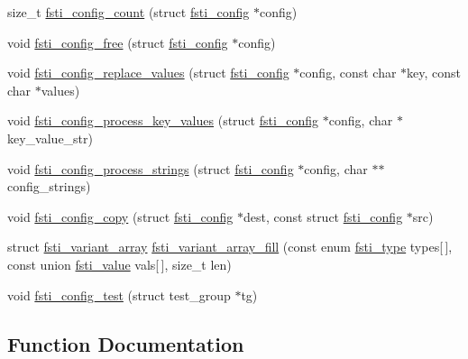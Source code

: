 \begin{DoxyCompactItemize}
size\+\_\+t \mbox{\hyperlink{fsti-config_8c_a508022bb109124636ed4c7e0002c2c08}{fsti\+\_\+config\+\_\+count}} (struct \mbox{\hyperlink{structfsti__config}{fsti\+\_\+config}} $\ast$config)
\item 
void \mbox{\hyperlink{fsti-config_8c_a89af0836846de6cf965e78643823705c}{fsti\+\_\+config\+\_\+free}} (struct \mbox{\hyperlink{structfsti__config}{fsti\+\_\+config}} $\ast$config)
\item 
void \mbox{\hyperlink{fsti-config_8c_ad11a9e59945cf4619a85164441ea5fd8}{fsti\+\_\+config\+\_\+replace\+\_\+values}} (struct \mbox{\hyperlink{structfsti__config}{fsti\+\_\+config}} $\ast$config, const char $\ast$key, const char $\ast$values)
\item 
void \mbox{\hyperlink{fsti-config_8c_a966baf752f37fcb8177ec0d42d9f103f}{fsti\+\_\+config\+\_\+process\+\_\+key\+\_\+values}} (struct \mbox{\hyperlink{structfsti__config}{fsti\+\_\+config}} $\ast$config, char $\ast$key\+\_\+value\+\_\+str)
\item 
void \mbox{\hyperlink{fsti-config_8c_ae86ff853ac86294d03a317636cdcbdaa}{fsti\+\_\+config\+\_\+process\+\_\+strings}} (struct \mbox{\hyperlink{structfsti__config}{fsti\+\_\+config}} $\ast$config, char $\ast$$\ast$config\+\_\+strings)
\item 
void \mbox{\hyperlink{fsti-config_8c_a634d47df34013cf7bba0c3dc67d8e45f}{fsti\+\_\+config\+\_\+copy}} (struct \mbox{\hyperlink{structfsti__config}{fsti\+\_\+config}} $\ast$dest, const struct \mbox{\hyperlink{structfsti__config}{fsti\+\_\+config}} $\ast$src)
\item 
struct \mbox{\hyperlink{structfsti__variant__array}{fsti\+\_\+variant\+\_\+array}} \mbox{\hyperlink{fsti-config_8c_a58182343b78c10550b55c54b4c61ea20}{fsti\+\_\+variant\+\_\+array\+\_\+fill}} (const enum \mbox{\hyperlink{fsti-defs_8h_ab12bd8dfbafbc55e2015aac7926007cf}{fsti\+\_\+type}} types\mbox{[}$\,$\mbox{]}, const union \mbox{\hyperlink{unionfsti__value}{fsti\+\_\+value}} vals\mbox{[}$\,$\mbox{]}, size\+\_\+t len)
\item 
void \mbox{\hyperlink{fsti-config_8c_a56851785b4dd54466e2d92ef3d55fc2f}{fsti\+\_\+config\+\_\+test}} (struct test\+\_\+group $\ast$tg)
\end{DoxyCompactItemize}


\subsection{Function Documentation}
\mbox{\label{fsti-config_8c_a5d0a69eb0415adc0b32d29a92c002890}} 
